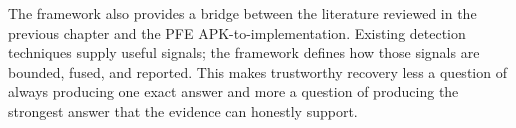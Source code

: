 The framework also provides a bridge between the literature reviewed in the
previous chapter and the PFE APK-to-\SBOM implementation. Existing detection
techniques supply useful signals; the framework defines how those signals are
bounded, fused, and reported. This makes trustworthy \SBOM recovery less a
question of always producing one exact answer and more a question of producing
the strongest answer that the evidence can honestly support.
